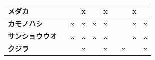 \documentclass[a4j,8.5pt, twocolumn,fleqn]{jbook}
\begin{document}
\begin{table}[htb]
\begin{tabular}{|l|c|c|c|c|c|c|c|c|c|}
        \textbf{メダカ}       &                                    &                                    & x                                &                                  & x                                &                                  &                                  & x                                &                                   \\ \hline
        \textbf{カモノハシ}     &                                    & x                                  & x                                & x                                & x                                &                                  &                                  & x                                & x                                 \\ \hline
        \textbf{サンショウウオ} &                                    & x                                  & x                                & x                                & x                                &                                  &                                  & x                                & x                                 \\ \hline
        \textbf{クジラ}       &                                    &                                    & x                                &                                  & x                                &                                  & x                                &                                  & x                                 \\ \hline
    \end{tabular}
\end{table}
\end{document}
